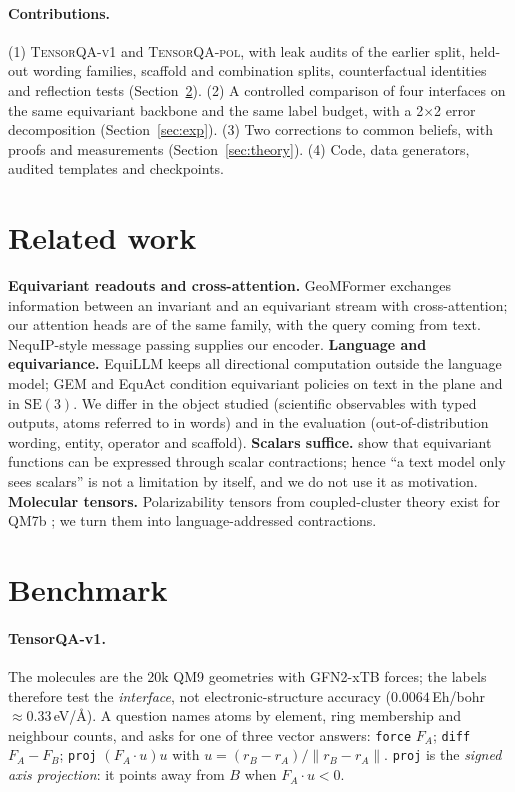 \documentclass[10pt]{article}
\begin{document}
\paragraph{Contributions.} (1) \textsc{TensorQA-v1} and \textsc{TensorQA-pol}, with leak audits of the earlier split, held-out
wording families, scaffold and combination splits, counterfactual identities and reflection tests (Section~\ref{sec:bench}).
(2) A controlled comparison of four interfaces on the same equivariant backbone and the same label budget, with a 2$\times$2 error
decomposition (Section~\ref{sec:exp}). (3) Two corrections to common beliefs, with proofs and measurements (Section~\ref{sec:theory}).
(4) Code, data generators, audited templates and checkpoints.

\section{Related work}
\textbf{Equivariant readouts and cross-attention.} GeoMFormer \citep{geomformer} exchanges information between an invariant and an
equivariant stream with cross-attention; our attention heads are of the same family, with the query coming from text. NequIP-style
message passing \citep{nequip,e3nn} supplies our encoder. \textbf{Language and equivariance.} EquiLLM \citep{equillm} keeps all
directional computation outside the language model; GEM \citep{gem} and EquAct \citep{equact} condition equivariant policies on text
in the plane and in $\mathrm{SE}(3)$. We differ in the object studied (scientific observables with typed outputs, atoms referred to
in words) and in the evaluation (out-of-distribution wording, entity, operator and scaffold). \textbf{Scalars suffice.}
\citet{villar} show that equivariant functions can be expressed through scalar contractions; hence ``a text model only sees scalars''
is not a limitation by itself, and we do not use it as motivation. \textbf{Molecular tensors.} Polarizability tensors from
coupled-cluster theory exist for QM7b \citep{qm7bpol,alphaml}; we turn them into language-addressed contractions.

\section{Benchmark}\label{sec:bench}
\paragraph{TensorQA-v1.} The molecules are the 20k QM9 \citep{qm9} geometries with GFN2-xTB \citep{xtb} forces; the labels therefore
test the \emph{interface}, not electronic-structure accuracy ($0.0064$\,Eh/bohr $\approx 0.33$\,eV/\AA). A question names atoms by
element, ring membership and neighbour counts, and asks for one of three vector answers: \texttt{force} $F_A$; \texttt{diff}
$F_A-F_B$; \texttt{proj} $(F_A\!\cdot\!u)u$ with $u=(r_B-r_A)/\|r_B-r_A\|$. \texttt{proj} is the \emph{signed axis projection}:
it points away from $B$ when $F_A\!\cdot\!u<0$.
\end{document}
